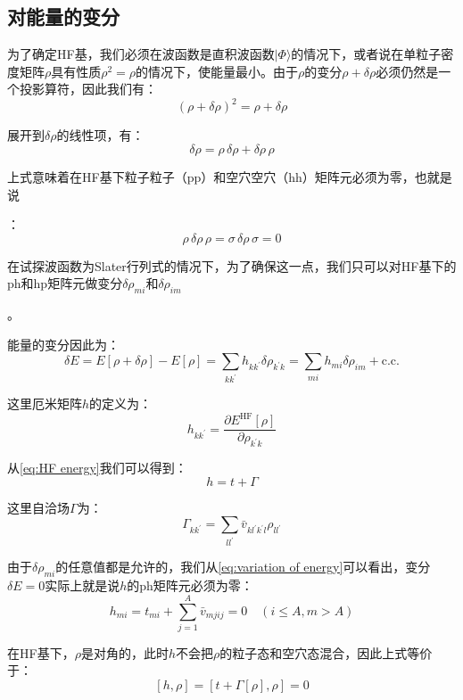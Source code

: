 \subsection{对能量的变分}

为了确定HF基，我们必须在波函数是直积波函数$|\Phi\rangle$的情况下，或者说在单粒子密度矩阵$\rho$具有性质$\rho^{2}=\rho$的情况下，使能量最小。由于$\rho$的变分$\rho+\delta\rho$必须仍然是一个投影算符，因此我们有：
\[
(\rho+\delta\rho)^{2}=\rho+\delta\rho
\]

展开到$\delta\rho$的线性项，有：
\[
\delta\rho=\rho\,\delta\rho+\delta\rho\,\rho
\]

上式意味着在HF基下粒子粒子（pp）和空穴空穴（hh）矩阵元必须为零，也就是说

：
\[
\rho\,\delta\rho\,\rho=\sigma\,\delta\rho\,\sigma=0
\]

在试探波函数为Slater行列式的情况下，为了确保这一点，我们只可以对HF基下的ph和hp矩阵元做变分$\delta\rho_{mi}$和$\delta\rho_{im}$

。

能量的变分因此为：
\begin{equation}
\delta E=E[\rho+\delta\rho]-E[\rho]=\sum_{kk^{\prime}}h_{kk^{\prime}}\delta\rho_{k^{\prime}k}=\sum_{mi}h_{mi}\delta\rho_{im}+\text{c.c.}\label{eq:variation of energy}
\end{equation}

这里厄米矩阵$h$的定义为：
\[
h_{kk^{\prime}}=\frac{\partial E^{\text{HF}}[\rho]}{\partial\rho_{k^{\prime}k}}
\]

从\ref{eq:HF energy}我们可以得到：
\[
h=t+\Gamma
\]

这里自洽场$\Gamma$为：
\[
\Gamma_{kk^{\prime}}=\sum_{ll^{\prime}}\bar{v}_{kl^{\prime}k^{\prime}l}\rho_{ll^{\prime}}
\]

由于$\delta\rho_{mi}$的任意值都是允许的，我们从\ref{eq:variation of energy}可以看出，变分$\delta E=0$实际上就是说$h$的ph矩阵元必须为零：
\[
h_{mi}=t_{mi}+\sum^{A}_{j=1}\bar{v}_{mjij}=0\quad(i\leq A,m>A)
\]

在HF基下，$\rho$是对角的，此时$h$不会把$\rho$的粒子态和空穴态混合，因此上式等价于：
\[
[h,\rho]=[t+\Gamma[\rho],\rho]=0
\]

